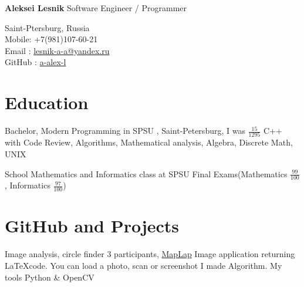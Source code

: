 \documentclass[12pt,a4paper]{moderncv}
\begin{document}

	\begin{minipage} {0.7\textwidth}
		\begin{flushleft}
			\huge \textbf{Aleksei Lesnik} 
			\newline
			\textcolor[gray]{0.4} {
			    \indent Software Engineer / Programmer\\
			}
			\normalsize
		\end{flushleft}
	\end{minipage}
	\begin{minipage} {0.3\textwidth}
		\begin{flushright}
			\textcolor[gray]{0.4} {
				\indent Saint-Ptersburg, Russia\\
				\indent Mobile: +7(981)107-60-21  \\
				\indent Email : \textcolor{blue} {\href{mailto:lesnik-a-a@yandex.ru} {lesnik-a-a@yandex.ru}}\\ 
				\indent GitHub : \textcolor{blue} {\href{https://github.com/a-alex-l} {a-alex-l}}\\  	
			}
		\end{flushright}
	\end{minipage}

    \section{Education}
    
         {Bachelor, Modern Programming in SPSU} {}{} {\textcolor{blue} {}, Saint-Petersburg, I was $\frac{15} {1295}$} {C++ with Code Review, Algorithms, Mathematical analysis, Algebra, Discrete Math, UNIX}
    
         {School} {}{} {Mathematics and Informatics class at SPSU} {Final Exams(Mathematics $\frac{99} {100}$, Informatics $\frac{97} {100}$)}
        
    \section{GitHub and Projects}
        
         {Image analysis, circle finder} {3 participants, \textcolor{blue} {\href{https://github.com/a-alex-l/MapLap} {MapLap}}} {} {\newline Image application returning \LaTeX code. You can load a photo, scan or screenshot} {I made Algorithm. My tools \textcolor{Attention} {Python \& OpenCV} }
        
\end{document}
